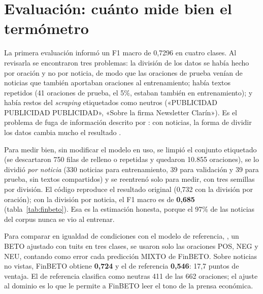 \section{Evaluación: cuánto mide bien el termómetro}

La primera evaluación informó un F1 macro de 0,7296 en cuatro clases. Al revisarla se
encontraron tres problemas: la división de los datos se había hecho por oración y no por
noticia, de modo que las oraciones de prueba venían de noticias que también aportaban
oraciones al entrenamiento; había textos repetidos (41 oraciones de prueba, el 5\%, estaban
también en entrenamiento); y había restos del \textit{scraping} etiquetados como neutros
(«PUBLICIDAD PUBLICIDAD PUBLICIDAD», «Sobre la firma Newsletter Clarín»). Es el problema de
fuga de información descrito por \citet{kapoor2023leakage}: con noticias, la forma de dividir
los datos cambia mucho el resultado \citep{xue2026temporal}.

Para medir bien, sin modificar el modelo en uso, se limpió el conjunto etiquetado (se
descartaron 750 filas de relleno o repetidas y quedaron 10.855 oraciones), se lo dividió
\textit{por noticia} (330 noticias para entrenamiento, 39 para validación y 39 para prueba,
sin textos compartidos) y se reentrenó solo para medir, con tres semillas por división. El
código reproduce el resultado original (0,732 con la división por oración); con la división
por noticia, el F1 macro es de \textbf{0,685} (tabla~\ref{tab:finbeto}). Esa es la estimación
honesta, porque el 97\% de las noticias del corpus nunca se vio al entrenar.

Para comparar en igualdad de condiciones con el modelo de referencia,
 \citep{perez2021pysentimiento}, un BETO
ajustado con tuits en tres clases, se usaron solo las oraciones POS, NEG y NEU, contando como
error cada predicción MIXTO de FinBETO. Sobre noticias no vistas, FinBETO obtiene
\textbf{0,724} y el de referencia \textbf{0,546}: 17,7 puntos de ventaja. El de referencia
clasifica como neutras 411 de las 662 oraciones; el ajuste al dominio es lo que le permite a
FinBETO leer el tono de la prensa económica.


